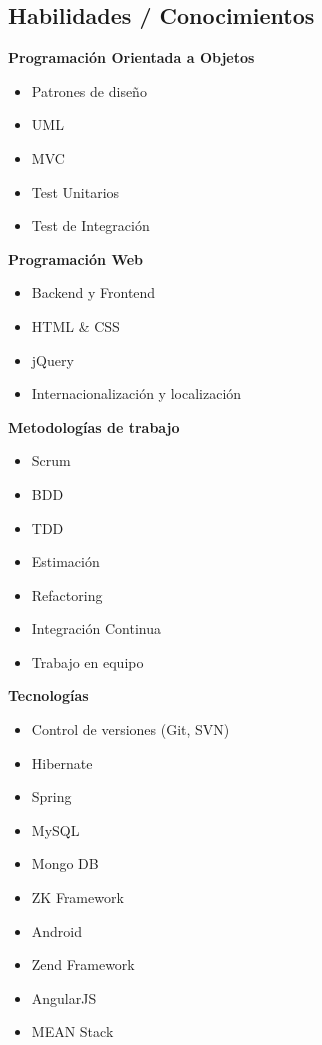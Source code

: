 \documentclass[margin, line, a4paper]{resume}
\begin{document}
\begin{resume}
    \section{\mysidestyle Habilidades / Conocimientos }

      \begin{multicols}{2}
        \textbf{Programación Orientada a Objetos}
          \begin{itemize}
            \item Patrones de diseño
            \item UML
            \item MVC
            \item Test Unitarios
            \item Test de Integración
          \end{itemize}
          
        \textbf{Programación Web}
          \begin{itemize}
            \item Backend y Frontend
            \item HTML \& CSS
            \item jQuery
            \item Internacionalización y localización
          \end{itemize}

        \textbf{Metodologías de trabajo}
          \begin{itemize}
            \item Scrum
            \item BDD
            \item TDD
            \item Estimación
            \item Refactoring
            \item Integración Continua
            \item Trabajo en equipo
          \end{itemize}

        \textbf{Tecnologías}
          \begin{itemize}
            \item Control de versiones (Git, SVN)
            \item Hibernate
            \item Spring
            \item MySQL
            \item Mongo DB
            \item ZK Framework
            \item Android
            \item Zend Framework
            \item AngularJS
            \item MEAN Stack
          \end{itemize}


\end{multicols}
\end{resume}
\end{document}
